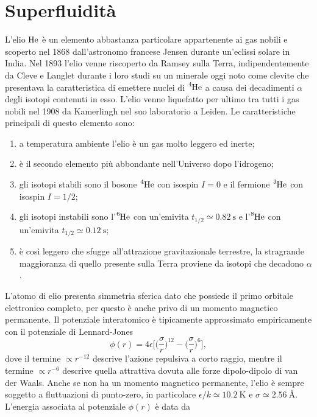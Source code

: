 \chapter{Superfluidità}
L'elio $\ce{He}$ è un elemento abbastanza particolare appartenente ai gas nobili e scoperto nel 1868 dall'astronomo francese Jensen durante un'eclissi solare in India. Nel 1893 l'elio venne riscoperto da Ramsey sulla Terra, indipendentemente da Cleve e Langlet durante i loro studi su un minerale oggi noto come clevite che presentava la caratteristica di emettere nuclei di $\ce{^4He}$ a causa dei decadimenti $\alpha$ degli isotopi contenuti in esso. L'elio venne liquefatto per ultimo tra tutti i gas nobili nel 1908 da Kamerlingh nel suo laboratorio a Leiden. Le caratteristiche principali di questo elemento sono:
\begin{enumerate}
    \item a temperatura ambiente l'elio è un gas molto leggero ed inerte;
    \item è il secondo elemento più abbondante nell'Universo dopo l'idrogeno;
    \item gli isotopi stabili sono il bosone $\ce{^4He}$ con isospin $I = 0$ e il fermione $\ce{^3He}$ con isospin $I = 1/2$;
    \item gli isotopi instabili sono l'$\ce{^6He}$ con un'emivita $t_{1/2} \simeq \SI{0.82}{\second}$ e l'$\ce{^8He}$ con un'emivita $t_{1/2} \simeq \SI{0.12}{\second}$;
    \item è così leggero che sfugge all'attrazione gravitazionale terrestre, la stragrande maggioranza di quello presente sulla Terra proviene da isotopi che decadono $\alpha$.
\end{enumerate}
L'atomo di elio presenta simmetria sferica dato che possiede il primo orbitale elettronico completo, per questo è anche privo di un momento magnetico permanente. Il potenziale interatomico è tipicamente approssimato empiricamente con il potenziale di Lennard-Jones
\begin{equation}
\label{eq: potenziale Lennard - Jones}
    \phi(r) = 4\epsilon\bigg[\bigg(\frac{\sigma}{r}\bigg)^{12} - \bigg(\frac{\sigma}{r}\bigg)^6\bigg],
\end{equation}
dove il termine $\propto r^{-12}$ descrive l'azione repulsiva a corto raggio, mentre il termine $\propto r^{-6}$ descrive quella attrattiva dovuta alle forze dipolo-dipolo di van der Waals. Anche se non ha un momento magnetico permanente, l'elio è sempre soggetto a fluttuazioni di punto-zero, in particolare $\epsilon/k \simeq \SI{10.2}{\kelvin}$ e $\sigma \simeq \SI{2.56}{\angstrom}$. L'energia associata al potenziale $\phi(r)$ è data da
